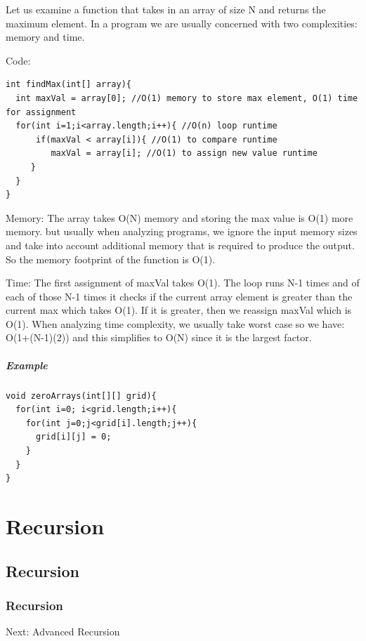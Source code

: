 \documentclass[11pt,oneside]{book}
\begin{document}
Let us examine a function that takes in an array of size N and returns the maximum element. In a program we are usually concerned with two complexities: memory and time.

Code:

\begin{lstlisting}
int findMax(int[] array){
  int maxVal = array[0]; //O(1) memory to store max element, O(1) time for assignment
  for(int i=1;i<array.length;i++){ //O(n) loop runtime
      if(maxVal < array[i]){ //O(1) to compare runtime
         maxVal = array[i]; //O(1) to assign new value runtime
     }
  }
}
\end{lstlisting}

Memory: The array takes O(N) memory and storing the max value is O(1) more memory. but usually when analyzing programs, we ignore the input memory sizes and take into account additional memory that is required to produce the output. So the memory footprint of the function is O(1).

Time: The first assignment of maxVal takes O(1). The loop runs N-1 times and of each of those N-1 times it checks if the current array element is greater than the current max which takes O(1). If it is greater, then we reassign maxVal which is O(1). When analyzing time complexity, we usually take worst case so we have: O(1+(N-1)(2)) and this simplifies to O(N) since it is the largest factor.

\subsubsection{Example}

\begin{lstlisting}
void zeroArrays(int[][] grid){
  for(int i=0; i<grid.length;i++){
    for(int j=0;j<grid[i].length;j++){
      grid[i][j] = 0;
    }
  }
}
\end{lstlisting}

\part{ Recursion }
    \chapter{ Recursion }
        \section{ Recursion }
        

Next: Advanced Recursion
\end{document}
